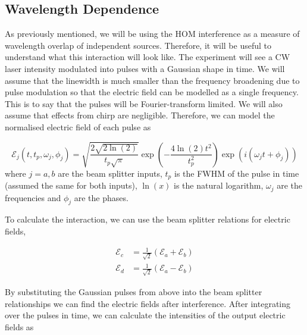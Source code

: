 
\subsection{Wavelength Dependence}
\label{sec:hom_shape}

As previously mentioned, we will be using the \ac{HOM} interference as a measure of wavelength overlap of independent sources. Therefore, it will be useful to understand what this interaction will look like. The experiment will see a \ac{CW} laser intensity modulated into pulses with a Gaussian shape in time. We will assume that the linewidth is much smaller than the frequency broadening due to pulse modulation so that the electric field can be modelled as a single frequency. This is to say that the pulses will be Fourier-transform limited. We will also assume that effects from chirp are negligible. Therefore, we can model the normalised electric field of each pulse as

\begin{equation}
	\mathcal{E}_j(t, t_p, \omega_j, \phi_j) = \sqrt{\frac{2 \sqrt{2\ln(2)}}{t_p\sqrt{\pi}}} \exp{\left(-\frac{4 \ln(2) t^2}{t_p^2}\right)} \exp{\left(i(\omega_j t + \phi_j)\right)}
\end{equation}
where $j = a,b$ are the beam splitter inputs, $t_p$ is the \ac{FWHM} of the pulse in time (assumed the same for both inputs), $\ln(x)$ is the natural logarithm, $\omega_j$ are the frequencies and $\phi_j$ are the phases. 

To calculate the interaction, we can use the beam splitter relations for electric fields,

\begin{align}
	\mathcal{E}_c &= \frac{1}{\sqrt{2}}\left(\mathcal{E}_a + \mathcal{E}_b \right)\\
	\mathcal{E}_d &= \frac{1}{\sqrt{2}}\left(\mathcal{E}_a - \mathcal{E}_b \right)
\end{align}

By substituting the Gaussian pulses from above into the beam splitter relationships we can find the electric fields after interference. After integrating over the pulses in time, we can calculate the intensities of the output electric fields as

